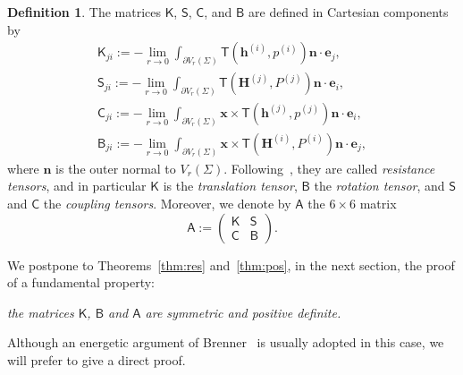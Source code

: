 \documentclass[final]{amsart}
\theoremstyle{definition}
\newtheorem{defn}[thm]{Definition}
\theoremstyle{definition}
\theoremstyle{remark}
\begin{document}
\begin{defn}
The matrices ${\mathsf K}$, ${\mathsf S}$, ${\mathsf C}$, and ${\mathsf B}$
are defined in Cartesian components by
\begin{gather}
\label{eq:tensorK}
{\mathsf K}_{ji}:=-\lim_{r\to 0}\int_{{\partial} V_r({\Sigma})}{\mathsf T}({\boldsymbol h}^{(i)},p^{(i)}){\boldsymbol n}\cdot{\boldsymbol e}_j,\\
\label{eq:tensorS}
{\mathsf S}_{ji}:=-\lim_{r\to 0}\int_{{\partial} V_r({\Sigma})}{\mathsf T}({\boldsymbol H}^{(j)},P^{(j)}){\boldsymbol n}\cdot{\boldsymbol e}_i,\\
\label{eq:tensorC}
{\mathsf C}_{ji}:=-\lim_{r\to 0}\int_{{\partial} V_r({\Sigma})}{\boldsymbol x}\times{\mathsf T}({\boldsymbol h}^{(j)},p^{(j)}){\boldsymbol n}\cdot{\boldsymbol e}_i,\\
\label{eq:tensorB}
{\mathsf B}_{ji}:=-\lim_{r\to 0}\int_{{\partial} V_r({\Sigma})}{\boldsymbol x}\times{\mathsf T}({\boldsymbol H}^{(i)},P^{(i)}){\boldsymbol n}\cdot{\boldsymbol e}_j,
\end{gather}
where ${\boldsymbol n}$ is the outer normal to
$V_r({\Sigma})$. Following~\cite{Bre64}, they are called {\em resistance
  tensors}, and in particular ${\mathsf K}$ is the {\em translation tensor},
${\mathsf B}$ the {\em rotation tensor}, and ${\mathsf S}$ and ${\mathsf C}$ the
{\em coupling tensors}. Moreover, we denote by ${\mathsf A}$ the $6\times 6$ matrix
\[
{\mathsf A}:=
\begin{pmatrix}
{\mathsf K} & {\mathsf S} \\
{\mathsf C} & {\mathsf B}
\end{pmatrix}.
\]
\end{defn}
We postpone to Theorems~\ref{thm:res} and~\ref{thm:pos}, in the next
section, the proof of a fundamental property: 
\begin{center}
\emph{the matrices ${\mathsf K}$,
${\mathsf B}$ and ${\mathsf A}$ are symmetric and positive definite.}
\end{center}
Although an energetic argument of Brenner~\cite[Section
5--2]{HapBre65} is usually adopted in this case, we will prefer to
give a direct proof.
\end{document}
